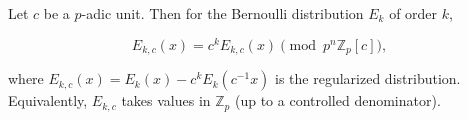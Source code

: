 Let $c$ be a $p$-adic unit. Then for the Bernoulli distribution $E_k$ of order $k$,

$$E_{k,c}(x) = c^k E_{k,c}(x) \pmod{p^n \mathbb{Z}_p[c]},$$

where $E_{k,c}(x) = E_k(x) - c^k E_k(c^{-1}x)$ is the regularized distribution.
Equivalently, $E_{k,c}$ takes values in $\mathbb{Z}_p$ (up to a controlled denominator).
